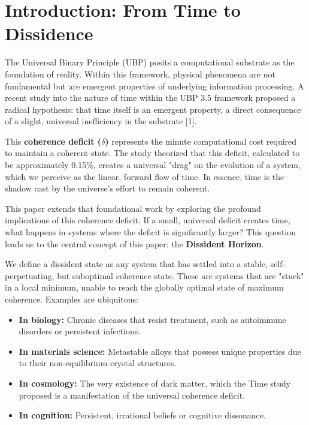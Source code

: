 \documentclass[12pt, a4paper]{article}
\begin{document}
\newpage

\section{Introduction: From Time to Dissidence}

The Universal Binary Principle (UBP) posits a computational substrate as the foundation of reality. Within this framework, physical phenomena are not fundamental but are emergent properties of underlying information processing. A recent study into the nature of time within the UBP 3.5 framework proposed a radical hypothesis: that time itself is an emergent property, a direct consequence of a slight, universal inefficiency in the substrate [1].

This \textbf{coherence deficit ($\delta$)} represents the minute computational cost required to maintain a coherent state. The study theorized that this deficit, calculated to be approximately 0.15\%, creates a universal "drag" on the evolution of a system, which we perceive as the linear, forward flow of time. In essence, time is the shadow cast by the universe’s effort to remain coherent.

This paper extends that foundational work by exploring the profound implications of this coherence deficit. If a small, universal deficit creates time, what happens in systems where the deficit is significantly larger? This question leads us to the central concept of this paper: the \textbf{Dissident Horizon}.

We define a dissident state as any system that has settled into a stable, self-perpetuating, but suboptimal coherence state. These are systems that are "stuck" in a local minimum, unable to reach the globally optimal state of maximum coherence. Examples are ubiquitous:

\begin{itemize}
    \item \textbf{In biology:} Chronic diseases that resist treatment, such as autoimmune disorders or persistent infections.
    \item \textbf{In materials science:} Metastable alloys that possess unique properties due to their non-equilibrium crystal structures.
    \item \textbf{In cosmology:} The very existence of dark matter, which the Time study proposed is a manifestation of the universal coherence deficit.
    \item \textbf{In cognition:} Persistent, irrational beliefs or cognitive dissonance.
\end{itemize}
\end{document}
